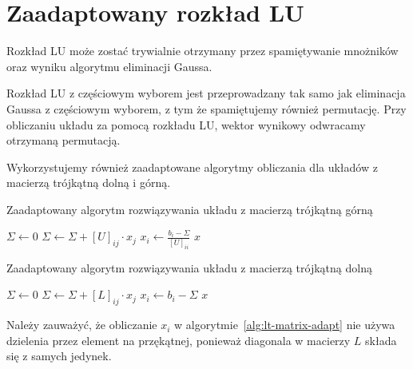 \documentclass[../main.tex]{subfiles}
\begin{document}
  \section{Zaadaptowany rozkład LU}

  Rozkład LU może zostać trywialnie otrzymany przez spamiętywanie mnożników
  oraz wyniku algorytmu eliminacji Gaussa. 

  Rozkład LU z częściowym wyborem jest przeprowadzany tak samo jak
  eliminacja Gaussa z częściowym wyborem, z tym że spamiętujemy również
  permutację. Przy obliczaniu układu za pomocą rozkładu LU, wektor wynikowy
  odwracamy otrzymaną permutacją.

  Wykorzystujemy również zaadaptowane algorytmy obliczania dla układów z macierzą
  trójkątną dolną i górną.

    \begin{algorithm}
      \caption{Zaadaptowany algorytm rozwiązywania układu z macierzą trójkątną górną}
      \label{alg:ut-matrix-adapt}
      \begin{algorithmic}[1]
            \State $\Sigma \gets 0$
              \State $\Sigma \gets \Sigma + [U]_{ij} \cdot x_j$
            \EndFor
            \State $x_i \gets \frac{b_i - \Sigma}{[U]_{ii}}$
          \EndFor
          \State \Return $x$
        \EndProcedure
      \end{algorithmic}
    \end{algorithm}

    \begin{algorithm}
      \caption{Zaadaptowany algorytm rozwiązywania układu z macierzą trójkątną dolną}
      \label{alg:lt-matrix-adapt}
      \begin{algorithmic}[1]
            \State $\Sigma \gets 0$
              \State $\Sigma \gets \Sigma + [L]_{ij} \cdot x_j$
            \EndFor
            \State $x_i \gets b_i - \Sigma$
          \EndFor
          \State \Return $x$
        \EndProcedure
      \end{algorithmic}
    \end{algorithm}

  Należy zauważyć, że obliczanie \( x_i \) w algorytmie~\ref{alg:lt-matrix-adapt}
  nie używa dzielenia przez element na przękątnej, ponieważ
  diagonala w macierzy \( L \) składa się z samych jedynek.
\end{document}
